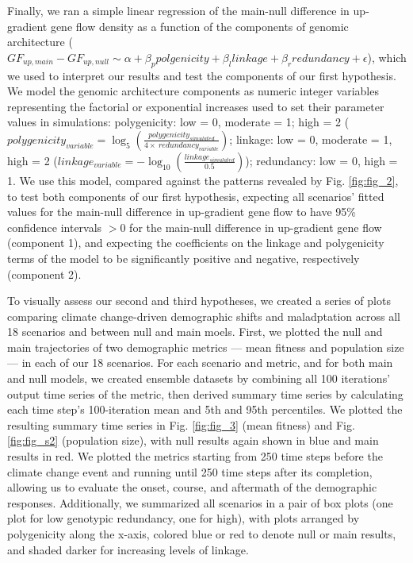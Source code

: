 \documentclass[9pt,twocolumn,twoside,lineno]{pnas-new}
\begin{document}
{Finally, we ran a simple linear regression
of the main-null difference in up-gradient gene flow density
as a function of the components of genomic architecture
($GF_{up,main}-GF_{up,null} \sim \alpha + \beta_{p}polgenicity + \beta_{l}linkage + \beta_{r}redundancy + \epsilon$),
which we used to interpret our results and test the components of our first hypothesis.
We model the genomic architecture components
as numeric integer variables
representing the factorial or exponential increases
used to set their parameter values in simulations:
polygenicity: low = 0, moderate = 1; high = 2 ($polygenicity_{variable}=\log_{5}(\frac{polygenicity_{simulated}}{4\times\ redundancy_{variable}})$;
linkage: low = 0, moderate = 1, high = 2 ($linkage_{variable}=-\log_{10}(\frac{linkage_{simulated}}{0.5})$);
redundancy: low = 0, high = 1.
We use this model, compared against
the patterns revealed by Fig. \ref{fig:fig_2},
to test both components of our first hypothesis,
expecting all scenarios' fitted values
for the main-null difference in up-gradient gene flow
to have 95\% confidence intervals $>0$ for the main-null difference in up-gradient gene flow (component 1),
and expecting the coefficients on the linkage and polygenicity
terms of the model to be significantly positive and
negative, respectively (component 2).

To visually assess our second and third hypotheses, we created a series of
plots comparing climate change-driven demographic shifts
and maladptation across all 18 scenarios and between null and main moels.
First, we plotted the 
null and main trajectories of two demographic
metrics --- mean fitness and population size --- in 
each of our 18 scenarios. For each scenario and metric, and 
for both main and null models, we created ensemble datasets by combining all 100 
iterations’ output time series of the metric,
then derived summary time series by calculating each time step's
100-iteration mean and 5th and 95th percentiles.
We plotted the resulting summary time series in Fig. \ref{fig:fig_3} (mean fitness)
and Fig. \ref{fig:fig_s2} (population size), with null results again shown in blue
and main results in red.
We plotted the metrics starting from 250 time steps before the climate change event
and running until 250 time steps after its completion, allowing us
to evaluate the onset, course, and aftermath of the demographic responses.
Additionally, we summarized all scenarios in a pair of box plots
(one plot for low genotypic redundancy, one for high),
with plots arranged by polygenicity along the x-axis,
colored blue or red to denote null or main results,
and shaded darker for increasing levels of linkage.

}
\end{document}
